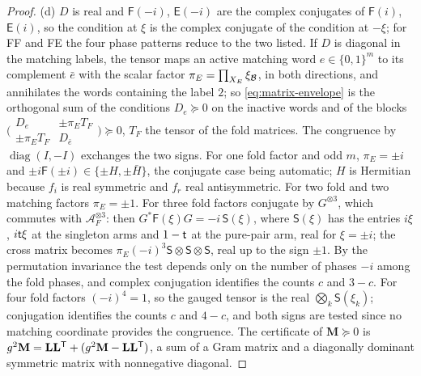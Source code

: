 \begin{proof}
(d) $D$ is real and $\mathsf F(-i)$, $\mathsf E(-i)$ are the complex conjugates of
$\mathsf F(i)$, $\mathsf E(i)$, so the condition at $\xi$ is the complex conjugate of the
condition at $-\xi$; for FF and FE the four phase patterns reduce to the two
listed. If $D$ is diagonal in the matching labels, the tensor maps an active
matching word $e\in\{0,1\}^m$ to its complement $\bar e$ with the scalar factor
$\pi_E=\prod_{X_E}\xi_\mathcal B$, in both directions, and annihilates the words containing
the label $2$; so \eqref{eq:matrix-envelope} is the orthogonal sum of the conditions
$D_e\succeq0$ on the inactive words and of the blocks
$\bigl(\begin{smallmatrix}D_e&\pm\pi_ET_F\\ \pm\pi_ET_F&D_{\bar e}\end{smallmatrix}\bigr)\succeq0$,
$T_F$ the tensor of the fold matrices. The congruence by $\operatorname{diag}(I,-I)$
exchanges the two signs. For one fold factor and odd $m$, $\pi_E=\pm i$ and
$\pm i\mathsf F(\pm i)\in\{\pm H,\pm\bar H\}$, the conjugate case being automatic; $H$ is
Hermitian because $f_i$ is real symmetric and $f_r$ real antisymmetric. For two fold
and two matching factors $\pi_E=\pm1$. For three fold factors conjugate by
$G^{\otimes3}$, which commutes with $\mathcal A_F^{\otimes3}$: then
$G^*\mathsf F(\xi)G=-i\,\mathsf S(\xi)$, where $\mathsf S(\xi)$ has the entries $i\xi$, $i\mathsf t\xi$
at the singleton arms and $1-\mathsf t$ at the pure-pair arm, real for $\xi=\pm i$; the
cross matrix becomes $\pi_E(-i)^3\mathsf S\otimes\mathsf S\otimes\mathsf S$, real up to the sign
$\pm1$. By the permutation invariance the test depends only on the number of phases
$-i$ among the fold phases, and complex conjugation identifies the counts $c$ and
$3-c$. For four fold factors $(-i)^4=1$, so the gauged tensor is the real
$\bigotimes_k\mathsf S(\xi_k)$; conjugation identifies the counts $c$ and $4-c$, and
both signs are tested since no matching coordinate provides the congruence. The
certificate of $\mathbf M\succeq0$ is
$g^2\mathbf M=\mathbf L\mathbf L^{\sf T}+(g^2\mathbf M-\mathbf L\mathbf L^{\sf T})$, a sum of a
Gram matrix and a diagonally dominant symmetric matrix with nonnegative diagonal.
\end{proof}

